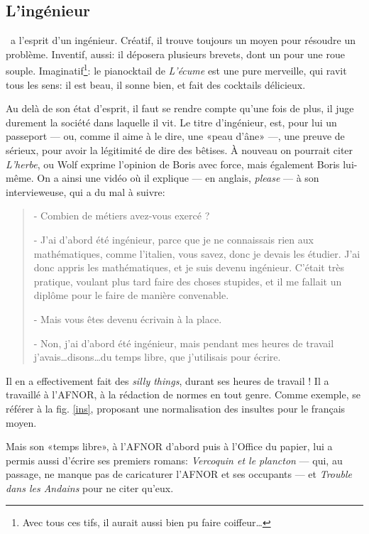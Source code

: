 \subsection{L'ingénieur}

\BV\ a l'esprit d'un ingénieur. Créatif, il trouve toujours
un moyen pour résoudre un problème. Inventif, aussi: il déposera
plusieurs brevets, dont un pour une roue souple. Imaginatif\footnote{Avec tous ces tifs,
il aurait aussi bien pu faire coiffeur\ldots}: le pianocktail de \emph{L'écume}
est une pure merveille, qui ravit tous les sens: il est beau, il sonne bien,
et fait des cocktails délicieux.

Au delà de son état d'esprit, il faut se rendre compte qu'une fois de plus,
il juge durement la société dans laquelle il vit. Le titre d'ingénieur, est,
pour lui un passeport --- ou, comme il aime à le dire, une «peau d'âne» ---, une
preuve de sérieux, pour avoir la légitimité de dire des bêtises. À nouveau on pourrait
citer \emph{L'herbe}, ou Wolf exprime l'opinion de Boris avec force, mais également
Boris lui-même. On a ainsi une vidéo où il explique --- en anglais, \emph{please} ---
à son intervieweuse, qui a du mal à suivre:

{\small
\begin{quotation}
- Combien de métiers avez-vous exercé ?

- J'ai d'abord été ingénieur, parce que je ne connaissais rien aux
mathématiques, comme l'italien, vous savez, donc je devais les étudier.
J'ai donc appris les mathématiques, et je suis devenu ingénieur.
C'était très pratique, voulant plus tard faire des choses stupides,
et il me fallait un diplôme pour le faire de manière convenable.

- Mais vous êtes devenu écrivain à la place.

- Non, j'ai d'abord été ingénieur, mais pendant mes heures de travail
j'avais\ldots disons\ldots du temps libre, que j'utilisais pour écrire.
\end{quotation}
}

Il en a effectivement fait des \emph{silly things}, durant ses heures de travail ! Il a
travaillé à l'AFNOR, à la rédaction de normes en tout genre. Comme exemple, se
référer à la fig. \ref{ins}, proposant une normalisation des insultes pour le français moyen.

Mais son «temps libre», à l'AFNOR d'abord puis à l'Office du papier, lui a permis aussi d'écrire ses premiers romans:
\emph{Vercoquin et le plancton} --- qui, au passage, ne manque pas de caricaturer l'AFNOR
et ses occupants --- et \emph{Trouble dans les Andains} pour ne citer qu'eux.

